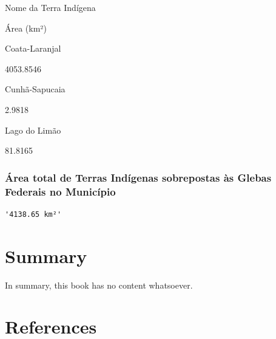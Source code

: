 \documentclass[
  letterpaper,
]{report}
\begin{document}
\n  

\n    

\n      

Nome da Terra Indígena

\n      

Área (km²)

\n    

\n  

\n  

\n    

\n      

Coata-Laranjal

\n      

4053.8546

\n    

\n    

\n      

Cunhã-Sapucaia

\n      

2.9818

\n    

\n    

\n      

Lago do Limão

\n      

81.8165

\n    

\n  

\n

\hypertarget{uxe1rea-total-de-terras-induxedgenas-sobrepostas-uxe0s-glebas-federais-no-municuxedpio-1}{%
\subsection{Área total de Terras Indígenas sobrepostas às Glebas
Federais no
Município}\label{uxe1rea-total-de-terras-induxedgenas-sobrepostas-uxe0s-glebas-federais-no-municuxedpio-1}}

\begin{verbatim}
'4138.65 km²'
\end{verbatim}


\hypertarget{summary}{%
\chapter{Summary}\label{summary}}

In summary, this book has no content whatsoever.


\hypertarget{references}{%
\chapter*{References}\label{references}}
\end{document}
